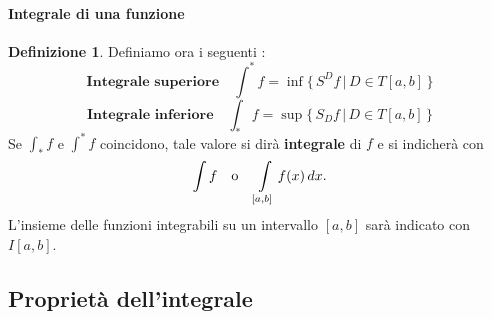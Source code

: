 \documentclass{article}
\theoremstyle{plain}
\theoremstyle{definition}
\newtheorem{defn}{Definizione}[section]
\theoremstyle{remark}
\begin{document}
\vspace{10pt}

\paragraph{Integrale di una funzione}
\begin{bxthm}
\begin{defn}
    Definiamo ora i seguenti :
    \[\textbf{Integrale superiore}\quad \int^*f=\inf\{\,S^Df\,|\,D\in T[a,b]\,\}\]
    \[\textbf{Integrale inferiore}\quad \int_*f=\sup\{\,S_Df\,|\,D\in T[a,b]\,\}\]
    Se $\int_*f$ e $\int^*f$ coincidono, tale valore si dirà \textbf{integrale} di $f$ e si indicherà con \[\int f\quad\textup{o}\quad \int\limits_{[a,b]}f(x)\,dx.\]    
    L'insieme delle funzioni integrabili su un intervallo $[a,b]$ sarà indicato con $I[a,b]$.
\end{defn}
\end{bxthm}

\vspace{10pt}
\subsection{Proprietà dell'integrale}
\vspace{10pt}
\end{document}
